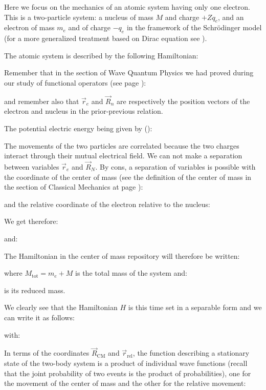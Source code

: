 	Here we focus on the mechanics of an atomic system having only one electron. This is a two-particle system: a nucleus of mass $M$ and charge $+Zq_e$, and an electron of mass $m_e$ and of charge $-q_e$ in the framework of the Schrödinger model (for a more generalized treatment based on Dirac equation see \cite{reiher2015relativistic}).
	
	The atomic system is described by the following Hamiltonian:
	
	Remember that in the section of Wave Quantum Physics we had proved during our study of functional operators (see page \pageref{hermitian operators of linear momentum}):
	
	and remember also that $\vec{r}_e$ and $\vec{R}_n$ are respectively the position vectors of the electron and nucleus in the prior-previous relation.
	
	The potential electric energy being given by ():
	
	The movements of the two particles are correlated because the two charges interact through their mutual electrical field. We can not make a separation between variables $\vec{r}_e$ and $\vec{R}_N$. By cons, a separation of variables is possible with the coordinate of the center of mass (see the definition of the center of mass in the section of Classical Mechanics at page \pageref{center of mass}):
	
	and the relative coordinate of the electron relative to the nucleus:
	
	We get therefore:
	
	and:
	
	The Hamiltonian in the center of mass repository will therefore be written:
	
	where $M_{\text{tot}}=m_e+M$ is the total mass of the system and:
	
	is its reduced mass.
	
	We clearly see that the Hamiltonian $H$ is this time set in a separable form and we can write it as follows:
	
	with:
	
	In terms of the coordinates $\vec{R}_{\text{CM}}$ and $\vec{r}_{\text{rel}}$, the function describing a stationary state of the two-body system is a product of individual wave functions (recall that the joint probability of two events is the product of probabilities), one for the movement of the center of mass and the other for the relative movement:
	
